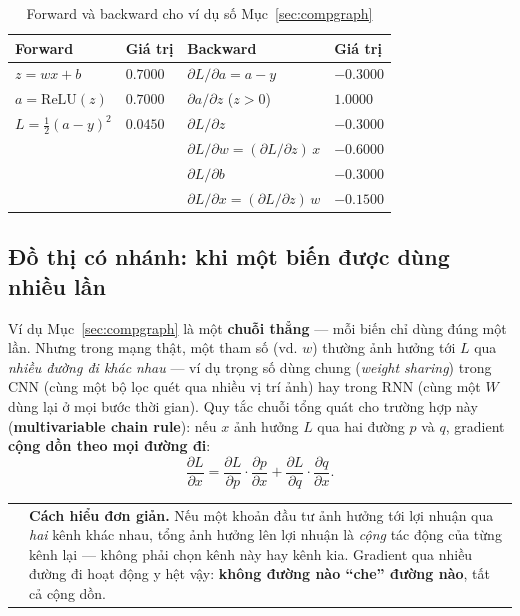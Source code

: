 \documentclass[12pt,a4paper]{article}
\makeatletter
\newenvironment{tructiep}[1][Cách hiểu đơn giản]
  {\par\smallskip\noindent\begin{tabular}{@{}p{0.35em}@{\hspace{6pt}}p{\dimexpr\linewidth-1.9em\relax}@{}}
   \textcolor{boxln}{\rule{2pt}{\baselineskip}} & \textbf{#1.}\enspace\ignorespaces}
  {\end{tabular}\par\smallskip}
\newcommand{\en}[1]{\textit{#1}}
\makeatother
\begin{document}
\begin{table}[htbp]
\centering
\caption{Forward và backward cho ví dụ số Mục~\ref{sec:compgraph}}
\begin{tabular}{@{}llll@{}}
\toprule
\textbf{Forward} & \textbf{Giá trị} & \textbf{Backward} & \textbf{Giá trị} \\
\midrule
$z=wx+b$ & $0.7000$ & $\partial L/\partial a = a-y$ & $-0.3000$ \\
$a=\mathrm{ReLU}(z)$ & $0.7000$ & $\partial a/\partial z$ ($z>0$) & $1.0000$ \\
$L=\tfrac12(a-y)^2$ & $0.0450$ & $\partial L/\partial z$ & $-0.3000$ \\
 & & $\partial L/\partial w = (\partial L/\partial z)\,x$ & $-0.6000$ \\
 & & $\partial L/\partial b$ & $-0.3000$ \\
 & & $\partial L/\partial x = (\partial L/\partial z)\,w$ & $-0.1500$ \\
\bottomrule
\end{tabular}
\label{tab:compgraph_numeric}
\end{table}

\subsection{Đồ thị có nhánh: khi một biến được dùng nhiều lần}
\label{sec:branching}

Ví dụ Mục~\ref{sec:compgraph} là một \textbf{chuỗi thẳng} --- mỗi biến chỉ
dùng đúng một lần. Nhưng trong mạng thật, một tham số (vd. $w$) thường ảnh
hưởng tới $L$ qua \emph{nhiều đường đi khác nhau} --- ví dụ trọng số dùng
chung (\en{weight sharing}) trong CNN (cùng một bộ lọc quét qua nhiều vị
trí ảnh) hay trong RNN (cùng một $W$ dùng lại ở mọi bước thời gian). Quy
tắc chuỗi tổng quát cho trường hợp này (\textbf{multivariable chain
rule}): nếu $x$ ảnh hưởng $L$ qua hai đường $p$ và $q$, gradient
\textbf{cộng dồn theo mọi đường đi}:
$$\frac{\partial L}{\partial x} = \frac{\partial L}{\partial p}\cdot\frac{\partial p}{\partial x} + \frac{\partial L}{\partial q}\cdot\frac{\partial q}{\partial x}.$$

\begin{tructiep}
Nếu một khoản đầu tư ảnh hưởng tới lợi nhuận qua \emph{hai} kênh khác
nhau, tổng ảnh hưởng lên lợi nhuận là \emph{cộng} tác động của từng kênh
lại --- không phải chọn kênh này hay kênh kia. Gradient qua nhiều đường đi
hoạt động y hệt vậy: \textbf{không đường nào ``che'' đường nào}, tất cả cộng
dồn.
\end{tructiep}
\end{document}
